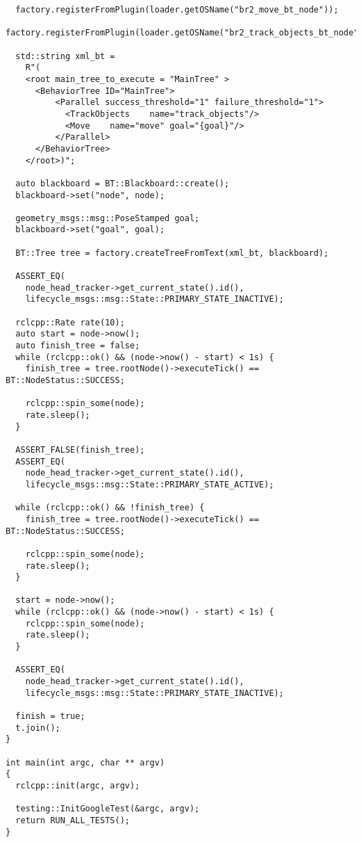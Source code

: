 \begin{tcolorbox}[sharp corners, colframe=gray!80, colback=LightGray, left=0pt, top=0pt, bottom=0pt, title=\texttt{br2\_bt\_patrolling/tests/bt\_action\_test.cpp}]
\begin{verbatim}
  factory.registerFromPlugin(loader.getOSName("br2_move_bt_node"));
  factory.registerFromPlugin(loader.getOSName("br2_track_objects_bt_node"));

  std::string xml_bt =
    R"(
    <root main_tree_to_execute = "MainTree" >
      <BehaviorTree ID="MainTree">
          <Parallel success_threshold="1" failure_threshold="1">
            <TrackObjects    name="track_objects"/>
            <Move    name="move" goal="{goal}"/>
          </Parallel>
      </BehaviorTree>
    </root>)";

  auto blackboard = BT::Blackboard::create();
  blackboard->set("node", node);

  geometry_msgs::msg::PoseStamped goal;
  blackboard->set("goal", goal);

  BT::Tree tree = factory.createTreeFromText(xml_bt, blackboard);

  ASSERT_EQ(
    node_head_tracker->get_current_state().id(),
    lifecycle_msgs::msg::State::PRIMARY_STATE_INACTIVE);

  rclcpp::Rate rate(10);
  auto start = node->now();
  auto finish_tree = false;
  while (rclcpp::ok() && (node->now() - start) < 1s) {
    finish_tree = tree.rootNode()->executeTick() == BT::NodeStatus::SUCCESS;

    rclcpp::spin_some(node);
    rate.sleep();
  }

  ASSERT_FALSE(finish_tree);
  ASSERT_EQ(
    node_head_tracker->get_current_state().id(),
    lifecycle_msgs::msg::State::PRIMARY_STATE_ACTIVE);

  while (rclcpp::ok() && !finish_tree) {
    finish_tree = tree.rootNode()->executeTick() == BT::NodeStatus::SUCCESS;

    rclcpp::spin_some(node);
    rate.sleep();
  }

  start = node->now();
  while (rclcpp::ok() && (node->now() - start) < 1s) {
    rclcpp::spin_some(node);
    rate.sleep();
  }

  ASSERT_EQ(
    node_head_tracker->get_current_state().id(),
    lifecycle_msgs::msg::State::PRIMARY_STATE_INACTIVE);

  finish = true;
  t.join();
}

int main(int argc, char ** argv)
{
  rclcpp::init(argc, argv);

  testing::InitGoogleTest(&argc, argv);
  return RUN_ALL_TESTS();
}
    \end{verbatim}
    \end{tcolorbox}
  \normalsize

